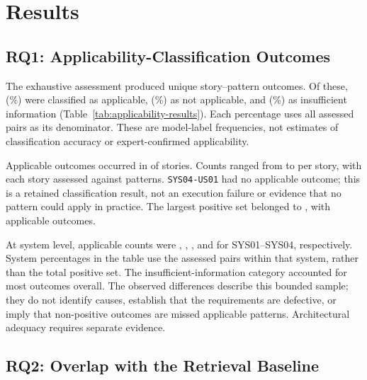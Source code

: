 \section{Results}
\label{sec:results}

\subsection{RQ1: Applicability-Classification Outcomes}
\label{sec:rq1-results}

The exhaustive assessment produced \StudyAssessmentCount{} unique
story--pattern outcomes. Of these, \StudyApplicableCount{}
(\RqOneApplicablePercent{}\%) were classified as applicable,
\StudyNotApplicableCount{} (\RqOneNotApplicablePercent{}\%) as not applicable,
and \StudyInsufficientInformationCount{}
(\RqOneInsufficientInformationPercent{}\%) as insufficient information
(Table~\ref{tab:applicability-results}). Each percentage uses all assessed
pairs as its denominator. These are model-label frequencies, not estimates
of classification accuracy or expert-confirmed applicability.



Applicable outcomes occurred in \StudyPositiveStoryCount{} of
\StudyStoryCount{} stories. Counts ranged from \RqOneStoryMinimum{} to
\RqOneStoryMaximum{} per story, with each story assessed against
\StudyPatternCount{} patterns. \texttt{SYS04-US01} had no applicable
outcome; this is a retained classification result, not an execution failure
or evidence that no pattern could apply in practice.
The largest positive set belonged to \texttt{\RqOneMaximumStories{}},
with \RqOneStoryMaximum{} applicable outcomes.

At system level, applicable counts were \RqOneSystemOneApplicableCount{},
\RqOneSystemTwoApplicableCount{}, \RqOneSystemThreeApplicableCount{}, and
\RqOneSystemFourApplicableCount{} for SYS01--SYS04, respectively.
System percentages in the table use the assessed pairs within that system,
rather than the total positive set. The insufficient-information category
accounted for most outcomes overall. The observed differences describe this
bounded sample; they do not identify causes, establish that the requirements
are defective, or imply that non-positive outcomes are missed applicable
patterns. Architectural adequacy requires separate evidence.

\subsection{RQ2: Overlap with the Retrieval Baseline}
\label{sec:rq2-results}

